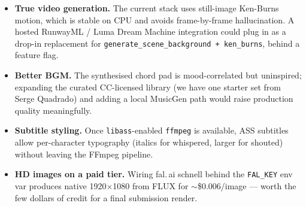 \documentclass[11pt,a4paper]{article}
\newcommand{\code}[1]{\texttt{\small #1}}
\begin{document}
\begin{itemize}
  \item \textbf{True video generation.} The current stack uses still-image
    Ken-Burns motion, which is stable on CPU and avoids frame-by-frame
    hallucination. A hosted RunwayML / Luma Dream Machine integration could
    plug in as a drop-in replacement for \code{generate\_scene\_background +
    ken\_burns}, behind a feature flag.
  \item \textbf{Better BGM.} The synthesised chord pad is mood-correlated but
    uninspired; expanding the curated CC-licensed library (we have one
    starter set from Serge Quadrado) and adding a local MusicGen path would
    raise production quality meaningfully.
  \item \textbf{Subtitle styling.} Once \code{libass}-enabled \code{ffmpeg} is
    available, ASS subtitles allow per-character typography (italics for
    whispered, larger for shouted) without leaving the FFmpeg pipeline.
  \item \textbf{HD images on a paid tier.} Wiring fal.\,ai schnell behind the
    \code{FAL\_KEY} env var produces native 1920$\times$1080 from FLUX for
    $\sim$\$0.006/image --- worth the few dollars of credit for a final
    submission render.
\end{itemize}
\end{document}
